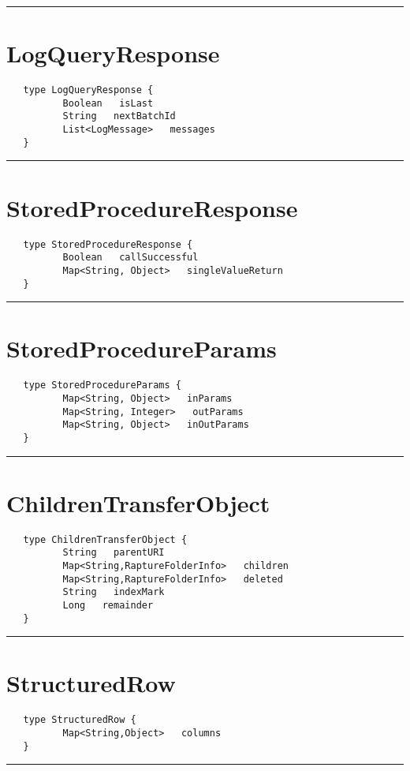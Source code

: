 \rule{12cm}{2pt}
\section{LogQueryResponse}
\label{type:LogQueryResponse}

\begin{verbatim}
   type LogQueryResponse {
          Boolean   isLast
          String   nextBatchId
          List<LogMessage>   messages
   }
\end{verbatim}

\rule{12cm}{2pt}
\section{StoredProcedureResponse}
\label{type:StoredProcedureResponse}

\begin{verbatim}
   type StoredProcedureResponse {
          Boolean   callSuccessful
          Map<String, Object>   singleValueReturn
   }
\end{verbatim}

\rule{12cm}{2pt}
\section{StoredProcedureParams}
\label{type:StoredProcedureParams}

\begin{verbatim}
   type StoredProcedureParams {
          Map<String, Object>   inParams
          Map<String, Integer>   outParams
          Map<String, Object>   inOutParams
   }
\end{verbatim}

\rule{12cm}{2pt}
\section{ChildrenTransferObject}
\label{type:ChildrenTransferObject}

\begin{verbatim}
   type ChildrenTransferObject {
          String   parentURI
          Map<String,RaptureFolderInfo>   children
          Map<String,RaptureFolderInfo>   deleted
          String   indexMark
          Long   remainder
   }
\end{verbatim}

\rule{12cm}{2pt}
\section{StructuredRow}
\label{type:StructuredRow}

\begin{verbatim}
   type StructuredRow {
          Map<String,Object>   columns
   }
\end{verbatim}

\rule{12cm}{2pt}
